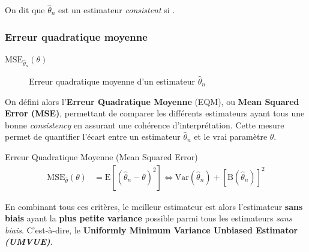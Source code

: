 \documentclass[10pt, french]{article}
\begin{document}
\begin{multicols*}{2}
\begin{definitionNOHFILL}
On dit que $\hat{\theta}_{n}$ est un estimateur \og \textit{consistent} \fg{} si .
\end{definitionNOHFILL}


\subsubsection{Erreur quadratique moyenne}
\begin{distributions}[Notation]
\begin{description}
	\item[$\text{MSE}_{\hat{\theta}_{n}}(\theta)$]	Erreur quadratique moyenne d'un estimateur $\hat{\theta}_{n}$
\end{description}
\end{distributions}

On défini alors l'\textbf{Erreur Quadratique Moyenne} (EQM), ou \textbf{Mean Squared Error (MSE)}, permettant de comparer les différents estimateurs ayant tous une bonne \textit{consistency} en assurant une cohérence d'interprétation. Cette mesure permet de quantifier l'écart entre un estimateur $\hat{\theta}_{n}$ et le vrai paramètre $\theta$.

\begin{algo}{Erreur Quadratique Moyenne (Mean Squared Error)}
\begin{align*}
	\text{MSE}_{\hat\theta}(\theta)
	&=	\text{E}[(\hat{\theta}_{n} - \theta)^{2}]
	\Leftrightarrow	\text{Var}(\hat{\theta}_{n}) + \left[\text{B}(\hat{\theta}_{n})\right]^{2}
\end{align*}
\end{algo}

En combinant tous ces critères, le meilleur estimateur est alors l'estimateur \textbf{sans biais} ayant la \textbf{plus petite variance} possible parmi tous les estimateurs \textit{sans biais}. C'est-à-dire, le \textbf{Uniformly Minimum Variance Unbiased Estimator \textit{(UMVUE)}}.

\columnbreak


\end{multicols*}
\end{document}
